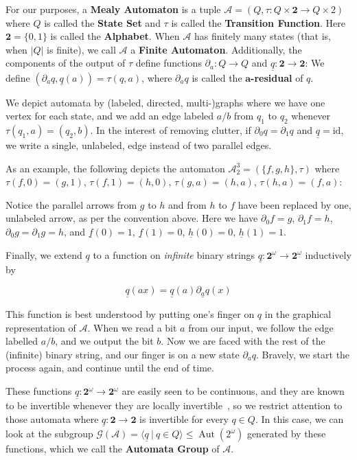 \documentclass[12pt]{article}
\theoremstyle{definition}
\DeclareMathOperator{\Aut}{Aut}
\newcommand{\del}{\partial}
\newcommand*{\abs}[1]{\left \lvert #1 \right \rvert}
\newcommand{\id}{\mathrm{id}}
\newcommand{\A}{\mathcal{A}}
\newcommand{\G}{\mathcal{G}}
\newcommand{\2}{\mathbf{2}}
\begin{document}
For our purposes, a \textbf{Mealy Automaton} is a tuple 
$\A = (Q,\tau : Q \times \2 \to Q \times 2)$ where $Q$ is called the 
\textbf{State Set} and $\tau$ is called the \textbf{Transition Function}. 
Here $\2 = \{0,1\}$ is called the \textbf{Alphabet}. When $\A$ has finitely
many states (that is, when $\abs{Q}$ is finite), we call $\A$ a 
\textbf{Finite Automaton}. Additionally, the components of the output of $\tau$
define functions $\del_a : Q \to Q$ and $\underline{q} : \2 \to \2$:
We define $(\del_a q, \underline{q}(a)) = \tau(q,a)$, where $\del_a q$ is
called the $\mathbf{a}$\textbf{-residual} of $q$.

We depict automata by (labeled, directed, multi-)graphs where we have one
vertex for each state, and we add an edge labeled $a / b$ from $q_1$ to $q_2$
whenever $\tau(q_1,a) = (q_2,b)$. In the interest of removing clutter, if
$\del_0 q = \del_1 q$ and $\underline{q} = \id$, we write a single, unlabeled,
edge instead of two parallel edges.

As an example, the following depicts the automaton 
$\A^3_2 = (\{f,g,h\},\tau)$ where 
$\tau(f,0) = (g,1)$, $\tau(f,1) = (h,0)$, 
$\tau(g,a) = (h,a)$, $\tau(h,a) = (f,a)$:

\missingfigure{$\A^3_2$}

Notice the parallel arrows from $g$ to $h$ and from $h$ to $f$ have been 
replaced by one, unlabeled arrow, as per the convention above. Here we have
$\del_0 f = g$, $\del_1 f = h$, $\del_0 g = \del_1 g = h$, and 
$\underline{f}(0) = 1$, $\underline{f}(1) = 0$, 
$\underline{h}(0) = 0$, $\underline{h}(1) = 1$.

Finally, we extend $\underline{q}$ to a function on \emph{infinite} binary 
strings $\underline{q} : \2^\omega \to \2^\omega$ inductively by

\[ \underline{q}(ax) = \underline{q}(a) \underline{\del_a q}(x) \]

This function is best understood by putting one's finger on $q$ in the 
graphical representation of $\A$. When we read a bit $a$ from our input, we 
follow the edge labelled $a / b$, and we output the bit $b$. Now we are faced
with the rest of the (infinite) binary string, and our finger is on a new state
$\del_a q$. Bravely, we start the process again, and continue until the end of time.


These functions $\underline{q} : \2^\omega \to \2^\omega$ are easily seen to
be continuous, and they are known to be invertible whenever they are locally 
invertible~\cite{SutnerLewi2012:IteratingInvertibleBinaryTransducers}, 
so we restrict attention to those automata where $\underline{q} : \2 \to \2$ 
is invertible for every $q \in Q$. In this case, we can look at the subgroup 
$\G(\A) = \langle \underline{q} ~|~ q \in Q \rangle \leq \Aut(2^\omega)$
generated by these functions, which we call the \textbf{Automata Group} of
$\A$. 
\end{document}
